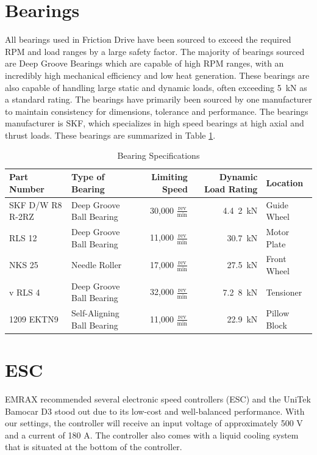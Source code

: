 \documentclass[main.tex]{subfiles}
\begin{document}
\section{Bearings}
All bearings used in Friction Drive have been sourced to exceed the required RPM and load ranges by a large safety factor. The majority of bearings sourced are Deep Groove Bearings which are capable of high RPM ranges, with an incredibly high mechanical efficiency and low heat generation. These bearings are also capable of handling large static and dynamic loads, often exceeding \SI{5}{kN} as a standard rating. The bearings have primarily been sourced by one manufacturer to maintain consistency for dimensions, tolerance and performance. The bearings manufacturer is SKF, which specializes in high speed bearings at high axial and thrust loads. These bearings are summarized in Table \ref{table:bearingtable}.\\

\begin{table}
\centering
  \begin{tabular}{@{}l l r r l@{}} \toprule
    Part Number & Type of Bearing & Limiting Speed & Dynamic Load Rating & Location \\ \midrule
    SKF D/W R8 R-2RZ & Deep Groove Ball Bearing & 30,000 $\frac{\mathrm{rev}}{\mathrm{min}}$ & \SI{4.4}2{kN} & Guide Wheel\\
    RLS 12 & Deep Groove Ball Bearing& 11,000 $\frac{\mathrm{rev}}{\mathrm{min}}$ & \SI{30.7}{kN} & Motor Plate\\
    NKS 25 & Needle Roller & 17,000 $\frac{\mathrm{rev}}{\mathrm{min}}$ & \SI{27.5}{kN} & Front Wheel\\
v    RLS 4 & Deep Groove Ball Bearing & 32,000 $\frac{\mathrm{rev}}{\mathrm{min}}$ & \SI{7.2}8{kN} & Tensioner \\
    1209 EKTN9 & Self-Aligning Ball Bearing & 11,000 $\frac{\mathrm{rev}}{\mathrm{min}}$ & \SI{22.9}{kN} & Pillow Block \\  \bottomrule
  \end{tabular}
  \caption{Bearing Specifications}
  \label{table:bearingtable}
\end{table}

    \section{ESC}
    EMRAX recommended several electronic speed controllers (ESC) and the UniTek Bamocar D3 stood out due to its low-cost and well-balanced performance. With our settings, the controller will receive an input voltage of approximately 500 V and a current of 180 A. The controller also comes with a liquid cooling system that is situated at the bottom of the controller.\\
\end{document}
